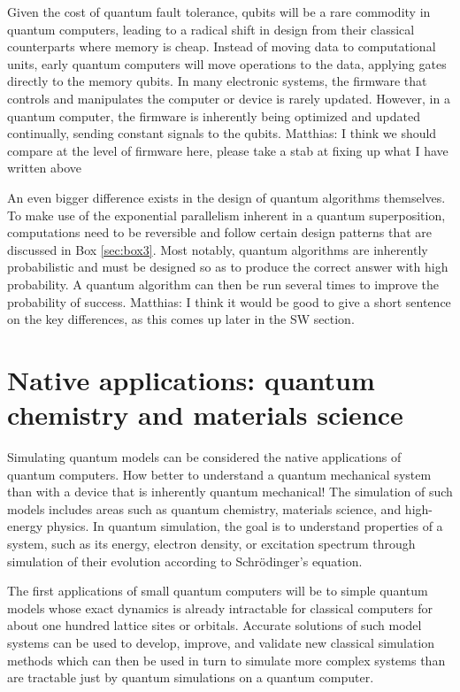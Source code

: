 \documentclass[journal]{IEEEtran}
\begin{document}
Given the cost of quantum fault tolerance, qubits will be a rare commodity in quantum computers, leading to a radical shift in design from their classical counterparts where memory is cheap. Instead of moving data to computational units, early quantum computers will move operations to the data, applying gates directly to the memory qubits.  
In many electronic systems, the firmware that controls and manipulates the computer or device is rarely updated.  However, in a quantum computer, the firmware is inherently being optimized and updated continually, sending constant signals to the qubits.
{\color{red} Matthias: I think we should compare at the level of firmware here, please take a stab at fixing up what I have written above }

 An even bigger difference exists in the design of quantum algorithms themselves. To make use of the  exponential parallelism inherent in a quantum superposition, computations need to be reversible and follow certain design patterns that are discussed in Box \ref{sec:box3}.  Most notably, quantum algorithms are inherently probabilistic and must be designed so as to produce the correct answer with high probability.  A quantum algorithm can then be run several times to improve the probability of success.
{\color{red} Matthias: I think it would be good to give a short sentence on the key differences, as this comes up later in the SW section.}





\section{Native applications: quantum chemistry and materials science}

Simulating quantum models can be considered the native applications of quantum computers. How better to understand a quantum mechanical system than with a device that is inherently quantum mechanical! The simulation of such models includes areas such as quantum chemistry, materials science, and high-energy physics. In quantum simulation, the goal is to understand properties of a system, such as its energy, electron density, or excitation spectrum through simulation of their evolution according to Schr\"odinger's equation.  

The first applications of small quantum computers will be to simple quantum models whose exact dynamics is already intractable for classical computers for about one hundred lattice sites or orbitals.  Accurate solutions of such model systems can be used to develop, improve, and validate new classical simulation methods which can then be used in turn to simulate more complex systems than are tractable just by quantum simulations on a quantum computer. 
\end{document}
